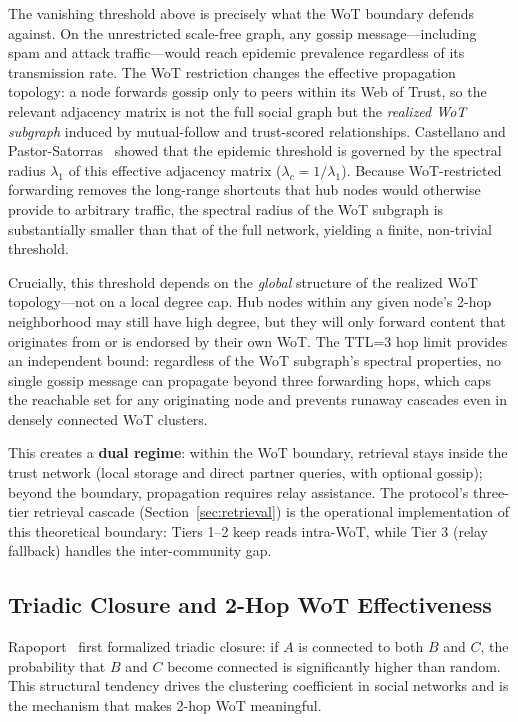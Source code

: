 \documentclass[11pt,a4paper]{article}
\begin{document}
The vanishing threshold above is precisely what the WoT boundary defends against. On the unrestricted scale-free graph, any gossip message---including spam and attack traffic---would reach epidemic prevalence regardless of its transmission rate. The WoT restriction changes the effective propagation topology: a node forwards gossip only to peers within its Web of Trust, so the relevant adjacency matrix is not the full social graph but the \emph{realized WoT subgraph} induced by mutual-follow and trust-scored relationships. Castellano and Pastor-Satorras~\cite{castellano} showed that the epidemic threshold is governed by the spectral radius $\lambda_1$ of this effective adjacency matrix ($\lambda_c = 1/\lambda_1$). Because WoT-restricted forwarding removes the long-range shortcuts that hub nodes would otherwise provide to arbitrary traffic, the spectral radius of the WoT subgraph is substantially smaller than that of the full network, yielding a finite, non-trivial threshold.

Crucially, this threshold depends on the \emph{global} structure of the realized WoT topology---not on a local degree cap. Hub nodes within any given node's 2-hop neighborhood may still have high degree, but they will only forward content that originates from or is endorsed by their own WoT. The TTL=3 hop limit provides an independent bound: regardless of the WoT subgraph's spectral properties, no single gossip message can propagate beyond three forwarding hops, which caps the reachable set for any originating node and prevents runaway cascades even in densely connected WoT clusters.

This creates a \textbf{dual regime}: within the WoT boundary, retrieval stays inside the trust network (local storage and direct partner queries, with optional gossip); beyond the boundary, propagation requires relay assistance. The protocol's three-tier retrieval cascade (Section~\ref{sec:retrieval}) is the operational implementation of this theoretical boundary: Tiers 1--2 keep reads intra-WoT, while Tier 3 (relay fallback) handles the inter-community gap.

\subsection{Triadic Closure and 2-Hop WoT Effectiveness}

Rapoport~\cite{rapoport} first formalized triadic closure: if $A$ is connected to both $B$ and $C$, the probability that $B$ and $C$ become connected is significantly higher than random. This structural tendency drives the clustering coefficient in social networks and is the mechanism that makes 2-hop WoT meaningful.
\end{document}
